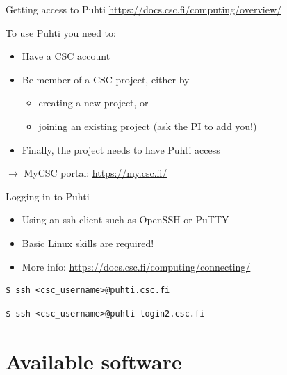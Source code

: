\documentclass[aspectratio=1610,14pt]{beamer}
\newcommand{\link}[1]{\alert{\url{#1}}}
\begin{document}
\begin{frame}{Getting access to Puhti}
  \link{https://docs.csc.fi/computing/overview/}

  \vspace{1em}

  To use Puhti you need to:
  \begin{itemize}
  \item Have a CSC account
  \item Be member of a CSC project, either by
    \begin{itemize}
    \item creating a new project, or
    \item joining an existing project (ask the PI to add you!)
    \end{itemize}
  \item Finally, the project needs to have Puhti access
  \end{itemize}

  \vspace{1em}

  $\rightarrow$ \quad MyCSC portal: \link{https://my.csc.fi/}

\end{frame}

\begin{frame}[fragile]{Logging in to Puhti}
  \begin{itemize}
  \item Using an ssh client such as OpenSSH or PuTTY
  \item Basic Linux skills are required!
  \item More info: \link{https://docs.csc.fi/computing/connecting/}
  \end{itemize}

  \vspace{1em}

\begin{verbatim}
$ ssh <csc_username>@puhti.csc.fi
\end{verbatim}

\begin{verbatim}
$ ssh <csc_username>@puhti-login2.csc.fi
\end{verbatim}

\end{frame}

\section{Available software}
\end{document}
